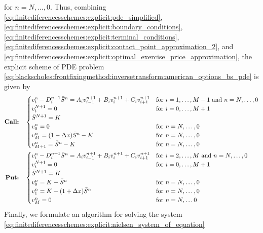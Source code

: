 for $n = N,\dots,0$. Thus, combining \eqref{eq:finitediferencesschemes:explicit:pde_simplified}, \eqref{eq:finitediferencesschemes:explicit:boundary_conditions}, 
\eqref{eq:finitediferencesschemes:explicit:terminal_conditions},
\eqref{eq:finitediferencesschemes:explicit:contact_point_approximation_2}, and \eqref{eq:finitediferencesschemes:explicit:optimal_exercise_price_approximation}, the explicit scheme of PDE problem \eqref{eq:blackscholes:frontfixingmethod:inversetransform:american_options_bs_pde} is given by
\begin{subequations}
  \label{eq:finitediferencesschemes:explicit:nielsen_system_of_equation}
  \begin{align}
    \text{\textbf{Call:}} \quad& \begin{cases}
      v^{n}_{i} - D^{n+1}_{i}\bar{S}^n = A_i v^{n+1}_{i-1} + B_{i}v^{n+1}_{i} + C_{i}v^{n+1}_{i+1} & \text{for $i = 1, \dots, M-1$ and $n = N,\dots, 0$}\\
      v^{N+1}_i = 0 & \text{for $i = 0, \dots, M+1$}  \\
      \bar{S}^{N+1} = K \\
      v^{n}_0 = 0 & \text{for $n = N, \dots, 0$} \\ 
      v^{n}_{M} = (1-\Delta{x})\bar{S}^n - K & \text{for $n = N, \dots, 0$} \\
      v^{n}_{M+1} = \bar{S}^n - K  & \text{for $n = N, \dots, 0$}
    \end{cases}\\
    \text{\textbf{Put:}} \quad&  \begin{cases}
      v^{n}_{i} - D^{n+1}_{i}\bar{S}^n = A_i v^{n+1}_{i-1} + B_{i}v^{n+1}_{i} + C_{i}v^{n+1}_{i+1} & \text{for $i = 2, \dots, M$ and $n = N,\dots,0$} \\
      v^{N+1}_i = 0 & \text{for $i = 0, \dots, M+1$} \\ 
      \bar{S}^{N+1} = K \\
      v^{n}_{0} = K - \bar{S}^{n} & \text{for $n = N, \dots, 0$} \\
      v^{n}_{1} =  K - (1+\Delta{x})\bar{S}^{n}  & \text{for $n = N, \dots, 0$} \\
      v^{n}_{M} = 0 & \text{for $n = N, \dots 0$}
    \end{cases}
  \end{align}
\end{subequations}
Finally, we formulate an algorithm for solving the system \eqref{eq:finitediferencesschemes:explicit:nielsen_system_of_equation}
